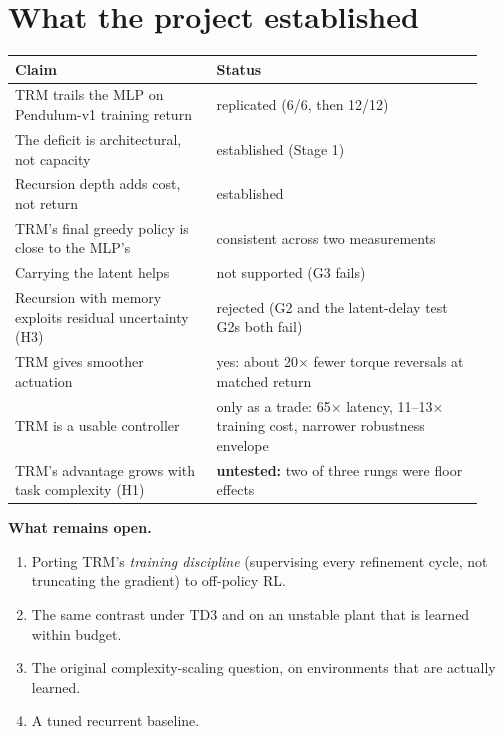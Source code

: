 \documentclass[11pt]{article}
\begin{document}
\medskip



\section*{What the project established}



\begin{center}\small\begin{tabular}{>{\raggedright\arraybackslash}p{0.400\linewidth}>{\raggedright\arraybackslash}p{0.534\linewidth}}
\toprule
Claim & Status \\
\midrule
TRM trails the MLP on Pendulum-v1 training return & replicated (6/6, then 12/12) \\
The deficit is architectural, not capacity & established (Stage 1) \\
Recursion depth adds cost, not return & established \\
TRM's final greedy policy is close to the MLP's & consistent across two measurements \\
Carrying the latent helps & not supported (G3 fails) \\
Recursion with memory exploits residual uncertainty (H3) & rejected (G2 and the latent-delay test G2s both fail) \\
TRM gives smoother actuation & yes: about 20$\times$ fewer torque reversals at matched return \\
TRM is a usable controller & only as a trade: 65$\times$ latency, 11--13$\times$ training cost, narrower robustness envelope \\
TRM's advantage grows with task complexity (H1) & \textbf{untested:} two of three rungs were floor effects \\
\bottomrule
\end{tabular}\end{center}



\textbf{What remains open.}

\begin{enumerate}
\item Porting TRM's \emph{training discipline} (supervising every refinement cycle, not truncating the gradient) to off-policy RL.
\item The same contrast under TD3 and on an unstable plant that is learned within budget.
\item The original complexity-scaling question, on environments that are actually learned.
\item A tuned recurrent baseline.
\end{enumerate}
\end{document}
